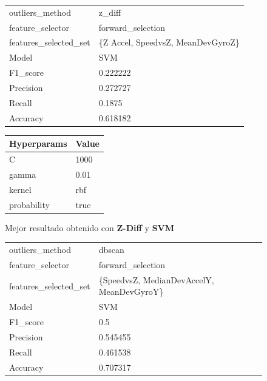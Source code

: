 \begin{appendices}
		\begin{figure}[htb]
			\centering
			\begin{tabular}{ll}
				\toprule
					  outliers\_method &                            z\_diff \\
					 feature\_selector &                 forward\_selection \\
				features\_selected\_set & \{Z Accel, SpeedvsZ, MeanDevGyroZ\} \\
								Model &                               SVM \\
						F1\_score &                          0.222222 \\
					   Precision &                          0.272727 \\
						  Recall &                            0.1875 \\
						Accuracy &                          0.618182 \\
				\bottomrule
			\end{tabular}
			\newline
			\newline

			\begin{tabular}{ll}
				\toprule
				Hyperparams & Value \\
				\midrule
						  C &  1000 \\
					  gamma &  0.01 \\
					 kernel &   rbf \\
				probability &  true \\
				\bottomrule
			\end{tabular}
			\caption{Mejor resultado obtenido con \textbf{Z-Diff} y \textbf{SVM}}
			\label{table:26}
		\end{figure}

		\begin{figure}[htb]
			\centering
			\begin{tabular}{ll}
				\toprule
					  outliers\_method &                                    dbscan \\
					 feature\_selector &                         forward\_selection \\
				features\_selected\_set & \{SpeedvsZ, MedianDevAccelY, MeanDevGyroY\} \\
								Model &                                       SVM \\
						F1\_score &                                       0.5 \\
					   Precision &                                  0.545455 \\
						  Recall &                                  0.461538 \\
						Accuracy &                                  0.707317 \\
				\bottomrule
			\end{tabular}
			\newline
			\newline


\end{figure}
\end{appendices}
